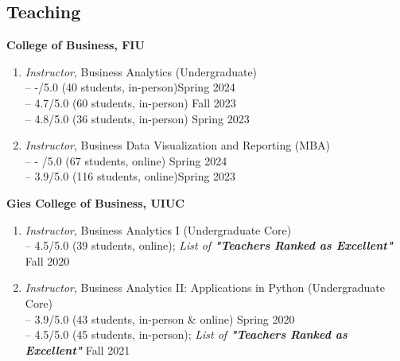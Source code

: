 \documentclass[margin,line]{resume}
\begin{document}
\begin{resume}
	  
 	  \section{\mysidestyle Teaching} 
 	  \textbf{College of Business, FIU}
 	    \begin{enumerate}[topsep=1pt, leftmargin=*]
         \item {\sl Instructor}, Business Analytics (Undergraduate)\\
         -- -/5.0 (40 students, in-person)\hfill Spring 2024\\
         -- 4.7/5.0 (60 students, in-person) \hfill Fall 2023\\
         -- 4.8/5.0 (36 students, in-person) \hfill Spring 2023
         \item {\sl Instructor}, Business Data Visualization and Reporting (MBA)\\
         -- - /5.0 (67 students, online) \hfill Spring 2024\\
         -- 3.9/5.0 (116 students, online)\hfill Spring 2023
         \end{enumerate}
 	  
         \textbf{Gies College of Business, UIUC}
         \begin{enumerate}[topsep=1pt, leftmargin=*]
         \item {\sl Instructor}, Business Analytics I (Undergraduate Core)\\ [0.3em]
         -- 4.5/5.0 (39 students, online); \textit{List of \textbf{"Teachers Ranked as Excellent"} } \hfill Fall 2020
         \item {\sl Instructor}, Business Analytics II: Applications in Python (Undergraduate Core)\\[0.3em]
         -- 3.9/5.0 (43 students, in-person \& online)  \hfill Spring 2020\\
         -- 4.5/5.0 (45 students, in-person); \textit{List of \textbf{"Teachers Ranked as Excellent"} } \hfill Fall 2021
         \end{enumerate}


\end{resume}
\end{document}
